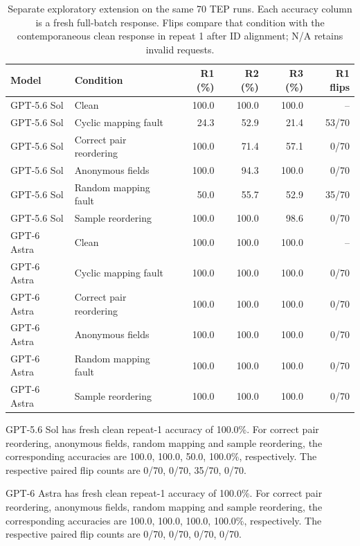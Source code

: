 \documentclass[11pt,a4paper]{article}
\begin{document}
\begin{table}[htbp]
\centering\small
\caption{Separate exploratory extension on the same 70 TEP runs. Each accuracy column is a fresh full-batch response. Flips compare that condition with the contemporaneous clean response in repeat 1 after ID alignment; N/A retains invalid requests.}
\label{tab:extension}
\begin{tabular}{@{}llrrrr@{}}
\toprule
Model & Condition & R1 (\%) & R2 (\%) & R3 (\%) & R1 flips \\
\midrule
GPT-5.6 Sol & Clean & 100.0 & 100.0 & 100.0 & -- \\
GPT-5.6 Sol & Cyclic mapping fault & 24.3 & 52.9 & 21.4 & 53/70 \\
GPT-5.6 Sol & Correct pair reordering & 100.0 & 71.4 & 57.1 & 0/70 \\
GPT-5.6 Sol & Anonymous fields & 100.0 & 94.3 & 100.0 & 0/70 \\
GPT-5.6 Sol & Random mapping fault & 50.0 & 55.7 & 52.9 & 35/70 \\
GPT-5.6 Sol & Sample reordering & 100.0 & 100.0 & 98.6 & 0/70 \\
\addlinespace
GPT-6 Astra & Clean & 100.0 & 100.0 & 100.0 & -- \\
GPT-6 Astra & Cyclic mapping fault & 100.0 & 100.0 & 100.0 & 0/70 \\
GPT-6 Astra & Correct pair reordering & 100.0 & 100.0 & 100.0 & 0/70 \\
GPT-6 Astra & Anonymous fields & 100.0 & 100.0 & 100.0 & 0/70 \\
GPT-6 Astra & Random mapping fault & 100.0 & 100.0 & 100.0 & 0/70 \\
GPT-6 Astra & Sample reordering & 100.0 & 100.0 & 100.0 & 0/70 \\
\bottomrule
\end{tabular}
\end{table}

GPT-5.6 Sol has fresh clean repeat-1 accuracy of 100.0\%. For correct pair reordering, anonymous fields, random mapping and sample reordering, the corresponding accuracies are 100.0, 100.0, 50.0, 100.0\%, respectively. The respective paired flip counts are 0/70, 0/70, 35/70, 0/70.

GPT-6 Astra has fresh clean repeat-1 accuracy of 100.0\%. For correct pair reordering, anonymous fields, random mapping and sample reordering, the corresponding accuracies are 100.0, 100.0, 100.0, 100.0\%, respectively. The respective paired flip counts are 0/70, 0/70, 0/70, 0/70.
\end{document}
